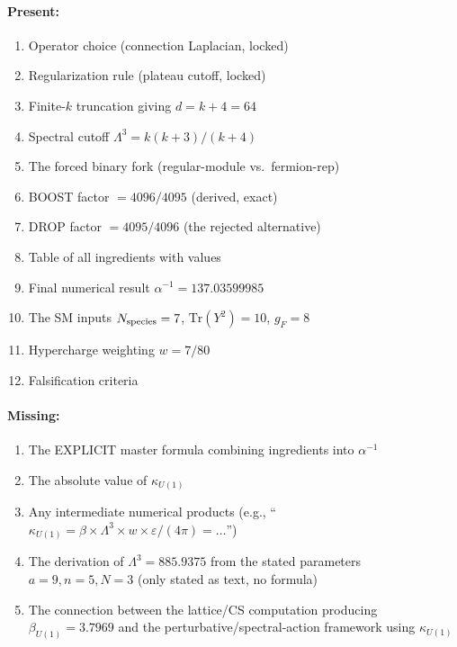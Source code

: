 \paragraph{Present:}
\begin{enumerate}
  \item Operator choice (connection Laplacian, locked)
  \item Regularization rule (plateau cutoff, locked)
  \item Finite-$k$ truncation giving $d = k + 4 = 64$
  \item Spectral cutoff $\Lambda^3 = k(k+3)/(k+4)$
  \item The forced binary fork (regular-module vs.\ fermion-rep)
  \item BOOST factor $= 4096/4095$ (derived, exact)
  \item DROP factor $= 4095/4096$ (the rejected alternative)
  \item Table of all ingredients with values
  \item Final numerical result $\alpha^{-1} = 137.03599985$
  \item The SM inputs $N_{\rm species} = 7$, $\mathrm{Tr}(Y^2) = 10$, $g_F = 8$
  \item Hypercharge weighting $w = 7/80$
  \item Falsification criteria
\end{enumerate}

\paragraph{Missing:}
\begin{enumerate}
  \item The EXPLICIT master formula combining ingredients into $\alpha^{-1}$
  \item The absolute value of $\kappa_{U(1)}$
  \item Any intermediate numerical products
        (e.g., ``$\kappa_{U(1)} = \beta \times \Lambda^3 \times w \times
        \varepsilon / (4\pi) = \ldots$'')
  \item The derivation of $\Lambda^3 = 885.9375$ from the stated parameters
        $a = 9, n = 5, N = 3$ (only stated as text, no formula)
  \item The connection between the lattice/CS computation producing
        $\beta_{U(1)} = 3.7969$ and the perturbative/spectral-action
        framework using $\kappa_{U(1)}$
\end{enumerate}

